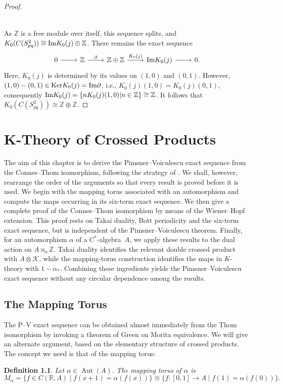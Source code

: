 \documentclass{book}
\newtheorem{definition}{Definition}[section]
\def\cstar{\(C^*\)-algebra}
\begin{document}
\begin{proof}
\begin{equation}
\begin{tikzcd}
    \end{tikzcd}
  \end{equation}
  As \(\mathbb{Z}\) is a free module over itself, this sequence splits, and \(K_0(C(S^2_{pq}))\cong \textnormal{Im}K_0(j)\oplus \mathbb{Z}\).
  There remains the exact sequence
  \begin{equation}\label{eq:8427}
    \begin{tikzcd}
      0\arrow[r]&\mathbb{Z}\arrow[r,"\partial"]&\mathbb{Z}\oplus\mathbb{Z}\arrow[r,"K_0(j)"]&\textnormal{Im}K_0(j)\arrow[r]&0.
    \end{tikzcd}
  \end{equation}
  Here, \(K_0(j)\) is determined by its values on \((1,0)\) and \((0,1)\). However, \((1,0)-(0,1)\in \textnormal{Ker} K_0(j)=\textnormal{Im}\partial\), i.e., \(K_0(j)(1,0)=K_0(j)(0,1)\),
  consequently \(\textnormal{Im}K_0(j)=\{nK_0(j)(1,0)| n\in\mathbb{Z}\}\cong\mathbb{Z}\).
  It follows that \(K_0(C(S^2_{pq}))\cong\mathbb{Z}\oplus\mathbb{Z}\).
\end{proof}

\chapter{K-Theory of Crossed Products}
The aim of this chapter is to derive the Pimsner--Voiculescu exact sequence 
from the Connes--Thom isomorphism, following the strategy of \cite[Chapter~V, Sections~10.3, 10.4 and 10.9]{Blackadar1998}. 
We shall, however, rearrange the order of the arguments so that every result is proved before it is used. 
We begin with the mapping torus associated with an automorphism and compute the maps occurring in its six-term exact 
sequence. We then give a complete proof of the Connes--Thom isomorphism by means of the Wiener--Hopf extension. 
This proof rests on Takai duality, Bott periodicity and the six-term exact sequence, but is independent of the 
Pimsner--Voiculescu theorem. Finally, for an automorphism \(\alpha\) of a \cstar\ \(A\), 
we apply these results to the dual action on \(A\rtimes_\alpha\mathbb{Z}\). 
Takai duality identifies the relevant double crossed product with \(A\otimes\mathcal{K}\), 
while the mapping-torus construction identifies the maps in \(K\)-theory with \(1-\alpha_*\). 
Combining these ingredients yields the Pimsner--Voiculescu exact sequence without any circular dependence among the results.

\section{The Mapping Torus}
The P--V exact sequence can be obtained almost immediately from the Thom
isomorphism by invoking a theorem of Green \cite{Green1977} on Morita equivalence. We
will give an alternate argument, based on the elementary structure of crossed
products. The concept we need is that of the mapping torus:
\begin{definition}
  Let \(\alpha\in\operatorname{Aut}(A)\). The \textnormal{mapping torus} of \(\alpha\) is 
  \[
    M_\alpha=\{f\in C(\mathbb R,A)\mid f(x+1)=\alpha(f(x))\}\cong\{f:[0,1]\to A\mid f(1)=\alpha(f(0))\}.
  \] 
\end{definition}
\end{document}
